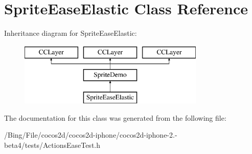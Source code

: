 \hypertarget{interface_sprite_ease_elastic}{\section{Sprite\-Ease\-Elastic Class Reference}
\label{interface_sprite_ease_elastic}
}
Inheritance diagram for Sprite\-Ease\-Elastic\-:\begin{figure}[H]
\begin{center}
\leavevmode
\includegraphics[height=3.000000cm]{interface_sprite_ease_elastic}
\end{center}
\end{figure}


The documentation for this class was generated from the following file\-:\begin{DoxyCompactItemize}
\item 
/\-Bing/\-File/cocos2d/cocos2d-\/iphone/cocos2d-\/iphone-\/2.-\/beta4/tests/Actions\-Ease\-Test.\-h\end{DoxyCompactItemize}
